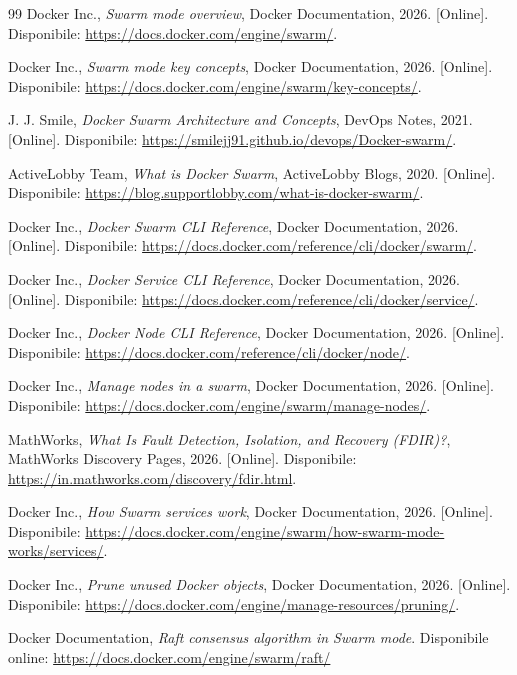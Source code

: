 \documentclass[12pt,a4paper]{article}
\begin{document}
\begin{thebibliography}{99}
Docker Inc.,
\textit{Swarm mode overview}, Docker Documentation, 2026.
[Online]. Disponibile: \url{https://docs.docker.com/engine/swarm/}.

Docker Inc.,
\textit{Swarm mode key concepts}, Docker Documentation, 2026.
[Online]. Disponibile: \url{https://docs.docker.com/engine/swarm/key-concepts/}.

J. J. Smile,
\textit{Docker Swarm Architecture and Concepts}, DevOps Notes, 2021.
[Online]. Disponibile: \url{https://smilejj91.github.io/devops/Docker-swarm/}.

ActiveLobby Team,
\textit{What is Docker Swarm}, ActiveLobby Blogs, 2020.
[Online]. Disponibile: \url{https://blog.supportlobby.com/what-is-docker-swarm/}.

Docker Inc.,
\textit{Docker Swarm CLI Reference}, Docker Documentation, 2026.
[Online]. Disponibile: \url{https://docs.docker.com/reference/cli/docker/swarm/}.

Docker Inc.,
\textit{Docker Service CLI Reference}, Docker Documentation, 2026.
[Online]. Disponibile: \url{https://docs.docker.com/reference/cli/docker/service/}.

Docker Inc.,
\textit{Docker Node CLI Reference}, Docker Documentation, 2026.
[Online]. Disponibile: \url{https://docs.docker.com/reference/cli/docker/node/}.

Docker Inc.,
\textit{Manage nodes in a swarm}, Docker Documentation, 2026.
[Online]. Disponibile: \url{https://docs.docker.com/engine/swarm/manage-nodes/}.

MathWorks,
\textit{What Is Fault Detection, Isolation, and Recovery (FDIR)?}, MathWorks Discovery Pages, 2026.
[Online]. Disponibile: \url{https://in.mathworks.com/discovery/fdir.html}.

Docker Inc.,
\textit{How Swarm services work}, Docker Documentation, 2026.
[Online]. Disponibile: \url{https://docs.docker.com/engine/swarm/how-swarm-mode-works/services/}.

Docker Inc.,
\textit{Prune unused Docker objects}, Docker Documentation, 2026.
[Online]. Disponibile: \url{https://docs.docker.com/engine/manage-resources/pruning/}.

Docker Documentation, \textit{Raft consensus algorithm in Swarm mode}. 
Disponibile online: \url{https://docs.docker.com/engine/swarm/raft/}
\end{thebibliography}
\end{document}
